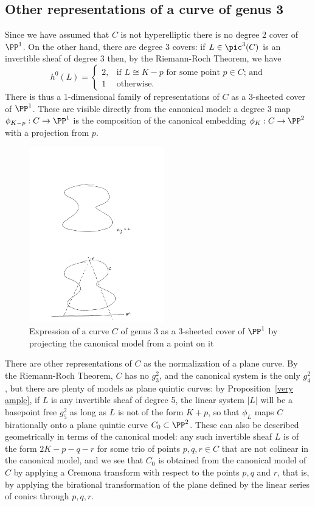 \subsection{Other representations of a curve of genus 3}
Since we have assumed that $C$ is not hyperelliptic there is no degree 2 cover of $\PP^1$. On the other hand, there are degree 3 covers: if $L \in \pic^3(C)$ is an invertible sheaf of degree 3 then, by the Riemann-Roch Theorem, we have
$$
h^0(L) = 
\begin{cases}
2, &\text{if $L \cong K-p$ for some point $p \in C$; and} \\
1 &\text{otherwise.}
\end{cases}
$$
There is thus a 1-dimensional family of representations of $C$ as a 3-sheeted cover of $\PP^1$. These are  visible directly from the canonical model: a degree 3 map $\phi_{K-p} : C \to \PP^1$ is the composition of the canonical embedding $\phi_K : C \to \PP^2$ with a projection from $p$. 


\begin{figure}
 \caption{Expression of a curve $C$ of genus 3 as a 3-sheeted cover of $\PP^1$ by projecting the canonical model from a point on it}
\centerline {\includegraphics[height=3in]{"Fig5.2.pdf"}}
\end{figure}


There are other representations of $C$ as the normalization of a plane curve. By the Riemann-Roch Theorem, $C$ has no $g^2_3$, and the canonical system is the only $g^2_4$, but there are plenty of models as plane quintic curves: by Proposition~\ref{very ample}, if $L$ is any invertible sheaf of degree 5, the linear system $|L|$ will be a basepoint free $g^2_5$ as long as $L$ is not of the form $K+p$, so that $\phi_L$ maps $C$ birationally onto a plane quintic curve $C_0 \subset \PP^2$. These can also be described geometrically in terms of the canonical model: any such invertible sheaf $L$ is of the form $2K-p-q-r$ for some trio of  points $p, q, r \in C$ that are not colinear in the canonical model, and we see  that $C_0$ is obtained from the canonical model of $C$ by applying a Cremona transform with respect to the points $p, q$ and $r$, that is, by applying the birational transformation
of the plane defined by the linear series of conics through $p,q,r$.

